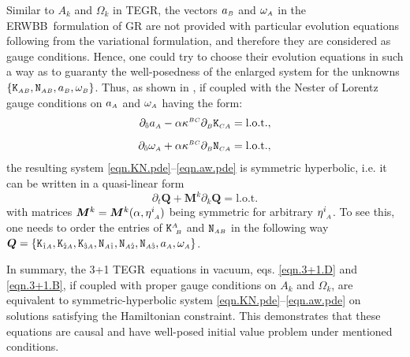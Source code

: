 \documentclass[
10pt, %
a4paper, %
oneside, %
twocolumn,
headinclude,footinclude, %
BCOR5mm, %
]{scrartcl}
\newcommand{\ERWBB}{{ERWBB}}
\newcommand{\sA}{\mathsmaller A}
\newcommand{\sB}{\mathsmaller B}
\newcommand{\sC}{\mathsmaller C}
\newcommand{\pd}[1]{\partial_{#1}}
\newcommand{\MG}[1]{\kappa^{#1}}			%
\newcommand{\itetrsymbol}{\eta}
\newcommand{\itetr}[2]{\itetrsymbol^{#1}_{\phantom{#1}#2}}
\newcommand{\Kbuch}[2]{\mathtt{K}_{{#1}{#2}}}	%
\newcommand{\Nbuchdown}[2]{\mathtt{N}_{#1#2}}	%
\newcommand{\Kbuchmix}[2]{\mathtt{K}^{#1}_{\ #2}}	%
\newcommand{\tegr}{TEGR}
\newcommand{\indalg}[1]{\hat{\mathsmaller{#1}}}
\begin{document}
	Similar to $ A_k $ and $ \Omega_k $ in TEGR, the vectors $ a_{\sB} $ and $
	\omega_{\sA} $ in the \ERWBB\ formulation of GR are not provided with
	particular evolution equations following from the variational formulation,
	and therefore they are considered as gauge conditions. Hence, one could try
	to choose their evolution equations in such a way as to guaranty the
	well-posedness of the enlarged system for the unknowns $
	\{\Kbuch{\sA}{\sB},\Nbuchdown{\sA}{\sB},a_\sB,\omega_\sB \}$. Thus, as shown
	in \cite{Estabrook1997,Buchman2003}, if coupled with the Nester of Lorentz
	gauge conditions on $a_\sA$ and $\omega_\sA$ having the form:
	\begin{subequations}\label{eqn.aw.pde}
		\begin{align}
			\pd{\indalg{0}} a_\sA - \alpha \MG{\sB\sC}\pd{\sB} \Kbuch{\sC}{\sA} &= \text{l.o.t.},
			\\[2mm]
			\pd{\indalg{0}} \omega_\sA + \alpha \MG{\sB\sC}\pd{\sB} \Nbuchdown{\sC}{\sA} &= \text{l.o.t.},
		\end{align}
	\end{subequations}
	the resulting system \eqref{eqn.KN.pde}--\eqref{eqn.aw.pde} is symmetric
	hyperbolic, i.e. it can be written in a quasi-linear form
	\begin{equation}\label{eqn.quasi.lin}
		\pd{t} \bm{Q} + \bm{M}^k\pd{k} \bm{Q} = \text{l.o.t.}
	\end{equation}
	with matrices $ \bm{M}^k = \bm{M}^k(\alpha,\itetr{i}{\sA})$ being symmetric for arbitrary $\itetr{i}{\sA}$.
	To see this, one needs to order the entries of
	$\Kbuchmix{\sA}{\sB}$ and $\Nbuchdown{\sA}{\sB}$ in the following way
	$\bm{Q} = \{\Kbuch{\indalg{1}}{\sA},\Kbuch{\indalg{2}}{\sA},\Kbuch{\indalg{3}}{\sA},\Nbuchdown{\sA}{\indalg{1}},\Nbuchdown{\sA}{\indalg{2}},\Nbuchdown{\sA}{\indalg{3}},a_\sA,\omega_\sA\}$.
	
	In summary, the 3+1 \tegr\ equations in vacuum, eqs. \eqref{eqn.3+1.D} and
	\eqref{eqn.3+1.B}, if coupled with proper gauge conditions on $A_k$ and
	$\Omega_k$, are equivalent to symmetric-hyperbolic system
	\eqref{eqn.KN.pde}--\eqref{eqn.aw.pde} on solutions satisfying the
	Hamiltonian constraint. This demonstrates that these equations are causal
	and have well-posed initial value problem under mentioned conditions.

	
\end{document}

